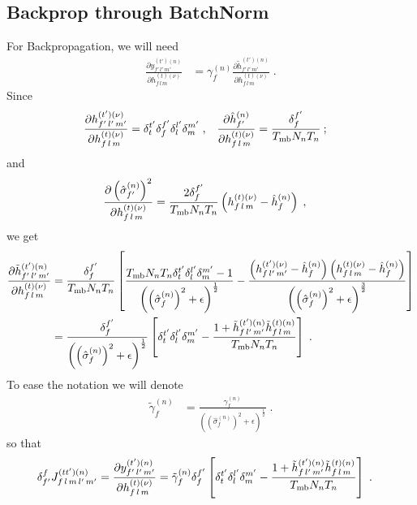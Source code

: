 \begin{subappendices}
\section{Backprop through BatchNorm} \label{sec:appenbatchnorm-vgg}


For Backpropagation, we will need
\begin{align}
\frac{\partial y^{(t')(n)}_{f'\,l'\,m'}}{\partial h_{f\,l\,m}^{(t)(\nu)}}&=
%
\gamma^{(n)}_f\frac{\partial \tilde{h}_{f'\,l'\,m'}^{(t')(n)}}{\partial h_{f\,l\,m}^{(t)(\nu)}}\;.
\end{align}
Since
\begin{align}
\frac{\partial h^{(t')(\nu)}_{f'\,l'\,m'}}{\partial h_{f\,l\,m}^{(t)(\nu)}}&=\delta^{t'}_t\delta^{f'}_f
%
\delta^{l'}_l\delta^{m'}_m\;,&
%
\frac{\partial \hat{h}_{f'}^{(n)}}{\partial h_{f\,l\,m}^{(t)(\nu)}}&=\frac{\delta^{f'}_f}{T_{{\rm mb}}N_nT_n}\:;
\end{align}
and
\begin{align}
\frac{\partial \left(\hat{\sigma}_{f'}^{(n)}\right)^2}{\partial h_{f\,l\,m}^{(t)(\nu)}}&=
%
\frac{2\delta^{f'}_f}{T_{{\rm mb}}N_nT_n}\left(h_{f\,l\,m}^{(t)(\nu)}-\hat{h}_{f}^{(n)}\right)\;,
\end{align}
we get
\begin{align}
\frac{\partial \tilde{h}_{f'\,l'\,m'}^{(t')(n)}}{\partial h_{f\,l\,m}^{(t)(\nu)}}&=
%
\frac{\delta^{f'}_f}{T_{{\rm mb}}N_nT_n}\left[\frac{T_{{\rm mb}}N_nT_n\delta^{t'}_t
%
\delta^{l'}_l\delta^{m'}_m-1}
%
{\left(\left(\hat{\sigma}_{f}^{(n)}\right)^2+\epsilon\right)^\frac12}-
%
\frac{\left(h_{f\,l'\,m'}^{(t')(\nu)}-\hat{h}_{f}^{(n)}\right)\left(h_{f\,l\,m}^{(t)(\nu)}-\hat{h}_{f}^{(n)}\right)}
%
{\left(\left(\hat{\sigma}_{f}^{(n)}\right)^2+\epsilon\right)^\frac32}\right]\notag\\
%
&=\frac{\delta^{f'}_f}{\left(\left(\hat{\sigma}_{f}^{(n)}\right)^2+\epsilon\right)^\frac12}
%
\left[\delta^{t'}_t\delta^{l'}_l\delta^{m'}_m-
%
\frac{1+\tilde{h}_{f\,l'\,m'}^{(t')(n)}\tilde{h}_{f\,l\,m}^{(t)(n)}}{T_{{\rm mb}}N_nT_n}\right]\;.
\end{align}
To ease the notation we will denote
\begin{align}
\tilde{\gamma}^{(n)}_f&=
%
\frac{\gamma^{(n)}_f}{\left(\left(\hat{\sigma}_{f}^{(n)}\right)^2+\epsilon\right)^\frac12}\;.
\end{align}
%
%
%
so that
\begin{align}
\delta^f_{f'}J^{(tt')(n)}_{f\,l\,m\,l'\,m'}&=
%
\frac{\partial y_{f'\,l'\,m'}^{(t')(n)}}{\partial h_{f\,l\,m}^{(t)(\nu)}}=
%
\tilde{\gamma}^{(n)}_f \delta^{f'}_f\left[\delta^{t'}_t\delta^{l'}_l\delta^{m'}_m-
%
\frac{1+\tilde{h}_{f\,l'\,m'}^{(t')(n)}\tilde{h}_{f\,l\,m}^{(t)(n)}}{T_{{\rm mb}}N_nT_n}\right]\;.
\end{align}


\end{subappendices}

